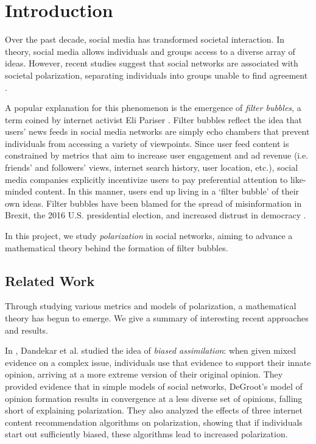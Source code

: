 
\section{Introduction}

Over the past decade, social media has transformed societal interaction. In theory, social media allows individuals and groups access to a diverse array of ideas. However, recent studies suggest that social networks are associated with societal polarization, separating individuals into groups unable to find agreement \cite{greatergood}. 

A popular explanation for this phenomenon is the emergence of \emph{filter bubbles}, a term coined by internet activist Eli Pariser \cite{Pariser}. Filter bubbles reflect the idea that users’ news feeds in social media networks are simply echo chambers that prevent individuals from accessing a variety of viewpoints. Since user feed content is constrained by metrics that aim to increase user engagement and ad revenue (i.e. friends’ and followers’ views, internet search history, user location, etc.), social media companies explicitly incentivize users to pay preferential attention to like-minded content. In this manner, users end up living in a ‘filter bubble’ of their own ideas. Filter bubbles have been blamed for the spread of misinformation in Brexit, the 2016 U.S. presidential election, and increased distrust in democracy \cite{filterbubble}.

In this project, we study \emph{polarization} in social networks, aiming to advance a mathematical theory behind the formation of filter bubbles. 

\subsection{Related Work}

Through studying various metrics and models of polarization, a mathematical theory has begun to emerge. We give a summary of interesting recent approaches and results. 

In \cite{Dandekarpnas}, Dandekar et al. studied the idea of \emph{biased assimilation}: when given mixed evidence on a complex issue, individuals use that evidence to support their innate opinion, arriving at a more extreme version of their original opinion. They provided evidence that in simple models of social networks, DeGroot's model of opinion formation \cite{Degroot} results in convergence at a less diverse set of opinions, falling short of explaining polarization. They also analyzed the effects of three internet content recommendation algorithms on polarization, showing that if individuals start out sufficiently biased, these algorithms lead to increased polarization.

